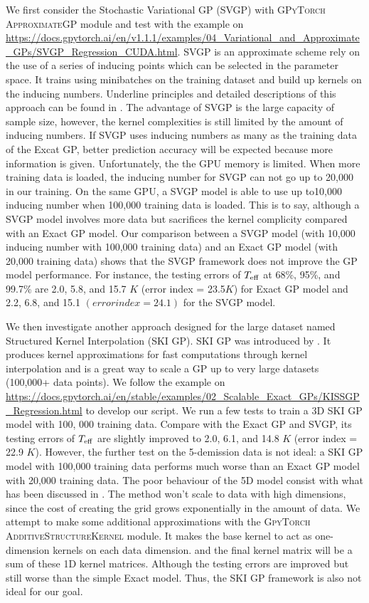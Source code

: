 We first consider the Stochastic Variational GP (SVGP) with \textsc{GPyTorch ApproximateGP} module and test with the example on \url{https://docs.gpytorch.ai/en/v1.1.1/examples/04_Variational_and_Approximate_GPs/SVGP_Regression_CUDA.html}. SVGP is an approximate scheme rely on the use of a series of inducing points which can be selected in the parameter space. It trains using minibatches on the training dataset and build up kernels on the inducing numbers. Underline principles and detailed descriptions of this approach can be found in \citet{hensman2015scalable}. The advantage of SVGP is the large capacity of sample size, however, the kernel complexities is still limited by the amount of inducing numbers. If SVGP uses inducing numbers as many as the training data of the Excat GP, better prediction accuracy will be expected because more information is given. Unfortunately, the the GPU memory is limited. When more training data is loaded, the inducing number for SVGP can not go up to 20,000 in our training. On the same GPU, a SVGP model is able to use up to10,000 inducing number when 100,000 training data is loaded. This is to say, although a SVGP model involves more data but sacrifices the kernel complicity compared with an Exact GP model. 
%
Our comparison between a SVGP model (with 10,000 inducing number with 100,000 training data) 
and an Exact GP model (with 20,000 training data) shows that the SVGP framework does not improve the GP model performance. 
%
For instance, the testing errors of $T_{\rm eff}$ at 68\%, 95\%, and 99.7\% are 2.0, 5.8, and 15.7 $K$ (error index = 23.5$K$)  for Exact GP model and 2.2, 6.8, and 15.1 $(error index = 24.1)$ for the SVGP model. 


We then investigate another approach designed for the large dataset named Structured Kernel Interpolation (SKI GP). SKI GP was introduced by \citet{wilson2015kernel}. It produces kernel approximations for fast computations through kernel interpolation and is a great way to scale a GP up to very large datasets (100,000+ data points). We follow the example on \url{https://docs.gpytorch.ai/en/stable/examples/02_Scalable_Exact_GPs/KISSGP_Regression.html} to develop our script. We run a few tests to train a 3D SKI GP model with 100, 000 training data. Compare with the Exact GP and SVGP, its testing errors of $T_{\rm eff}$ are slightly improved to 2.0, 6.1, and 14.8 $K$ (error index = 22.9 $K$). However, the further test on the 5-demission data is not ideal: a SKI GP model with 100,000 training data performs much worse than an Exact GP model with 20,000 training data. The poor behaviour of the 5D model consist with what has been discussed in \citet{wilson2015kernel}. The method won’t scale to data with high dimensions, since the cost of creating the grid grows exponentially in the amount of data. We attempt to make some additional approximations with the \textsc{GpyTorch AdditiveStructureKernel} module. It makes the base kernel to act as one-dimension kernels on each data dimension. and the final kernel matrix will be a sum of these 1D kernel matrices. Although the testing errors are improved but still worse than the simple Exact model. Thus, the SKI GP framework is also not ideal for our goal.   

